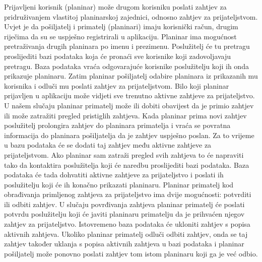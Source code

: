 				Prijavljeni korisnik (planinar) može drugom korisniku poslati zahtjev za pridruživanjem vlastitoj planinarskoj zajednici, odnosno zahtjev za prijateljstvom. Uvjet je da pošiljatelj i primatelj (planinari) imaju korisnički račun, drugim riječima da su se uspješno registrirali u aplikaciju. Planinar ima mogućnost pretraživanja drugih planinara po imenu i prezimenu. Poslužitelj će tu pretragu proslijediti bazi podataka koja će pronaći sve korisnike koji zadovoljavaju pretragu. Baza podataka vraća odgovarajuće korisnike poslužitelju koji ih onda prikazuje planinaru. Zatim planinar pošiljatelj odabire planinara iz prikazanih mu korisnika i odluči mu poslati zahtjev za prijateljstvom. Bilo koji planinar prijavljen u aplikaciju može vidjeti sve trenutno aktivne zahtjeve za prijateljstvo. U našem slučaju planinar primatelj može ili dobiti obavijest da je primio zahtjev ili može zatražiti pregled pristiglih zahtjeva. Kada planinar prima novi zahtjev poslužitelj prolongira zahtjev do planinara primatelja i vraća se povratna informacija do planinara pošiljatelja da je zahtjev uspješno poslan. Za to vrijeme u bazu podataka će se dodati taj zahtjev među aktivne zahtjeve za prijateljstvom. Ako planinar sam zatraži pregled svih zahtjeva to će napraviti tako da kontaktira poslužitelja koji će naredbu proslijediti bazi podataka. Baza podataka će tada dohvatiti aktivne zahtjeve za prijateljstvo i poslati ih poslužitelju koji će ih konačno prikazati planinaru. Planinar primatelj kod obrađivanja primljenog zahtjeva za prijateljstvo ima dvije mogućnosti: potvrditi ili odbiti zahtjev. U slučaju povrđivanja zahtjeva planinar primatelj će poslati potvrdu poslužitelju  koji će javiti planinaru primatelju da je prihvaćen njegov zahtjev za prijateljstvo. Istovremeno baza podataka će ukloniti zahtjev s popisa aktivnih zahtjeva. Ukoliko planinar primatelj odluči odbiti zahtjev, onda se taj zahtjev također uklanja s popisa aktivnih zahtjeva u bazi podataka i planinar pošiljatelj može ponovno poslati zahtjev tom istom planinaru koji ga je već odbio.
				
